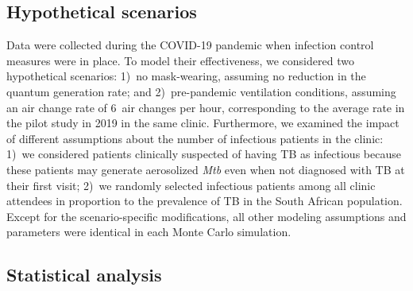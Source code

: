 \documentclass[fleqn,11pt]{wlscirep}
\begin{document}
\subsection*{}


\subsection*{Hypothetical scenarios}

Data were collected during the COVID-19 pandemic when infection control measures were in place. To model their effectiveness, we considered two hypothetical scenarios: 1)~no mask-wearing, \ie assuming no reduction in the quantum generation rate; and 2)~pre-pandemic ventilation conditions, \ie assuming an air change rate of 6~air changes per hour, corresponding to the average rate in the pilot study in 2019 in the same clinic\cite{Zurcher2022JID}. Furthermore, we examined the impact of different assumptions about the number of infectious patients in the clinic: 1)~we considered patients clinically suspected of having TB as infectious because these patients may generate aerosolized \emph{Mtb} even when not diagnosed with TB at their first visit\cite{Patterson2024PNAS}; 2)~we randomly selected infectious patients among all clinic attendees in proportion to the prevalence of TB in the South African population\cite{Moyo2022LancetID}. Except for the scenario-specific modifications, all other modeling assumptions and parameters were identical in each Monte Carlo simulation. 

\subsection*{Statistical analysis}
\end{document}
